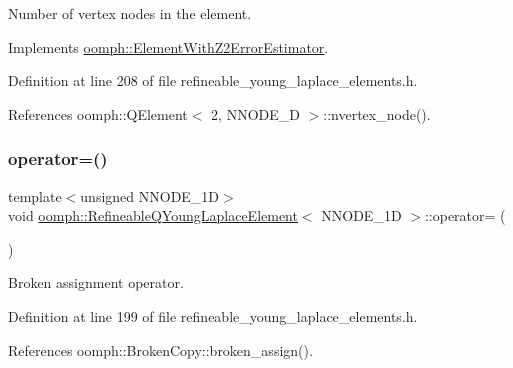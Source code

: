 Number of vertex nodes in the element. 



Implements \hyperlink{classoomph_1_1ElementWithZ2ErrorEstimator_a19495a0e77ef4ff35f15fdf7913b4077}{oomph\+::\+Element\+With\+Z2\+Error\+Estimator}.



Definition at line 208 of file refineable\+\_\+young\+\_\+laplace\+\_\+elements.\+h.



References oomph\+::\+Q\+Element$<$ 2, N\+N\+O\+D\+E\+\_\+D $>$\+::nvertex\+\_\+node().

\mbox{\label{classoomph_1_1RefineableQYoungLaplaceElement_a7f08b6569d2df5aa65562bfc98109c54}} 
\subsubsection{\texorpdfstring{operator=()}{operator=()}}
{\footnotesize\ttfamily template$<$unsigned N\+N\+O\+D\+E\+\_\+1D$>$ \\
void \hyperlink{classoomph_1_1RefineableQYoungLaplaceElement}{oomph\+::\+Refineable\+Q\+Young\+Laplace\+Element}$<$ N\+N\+O\+D\+E\+\_\+1D $>$\+::operator= (\begin{DoxyParamCaption}\item[{const \hyperlink{classoomph_1_1RefineableQYoungLaplaceElement}{Refineable\+Q\+Young\+Laplace\+Element}$<$ N\+N\+O\+D\+E\+\_\+1D $>$ \&}]{ }\end{DoxyParamCaption})\hspace{0.3cm}{\ttfamily [inline]}}



Broken assignment operator. 



Definition at line 199 of file refineable\+\_\+young\+\_\+laplace\+\_\+elements.\+h.



References oomph\+::\+Broken\+Copy\+::broken\+\_\+assign().

\mbox{\label{classoomph_1_1RefineableQYoungLaplaceElement_a2a8efe3d30e165de70aad77536bf55c9}} 
